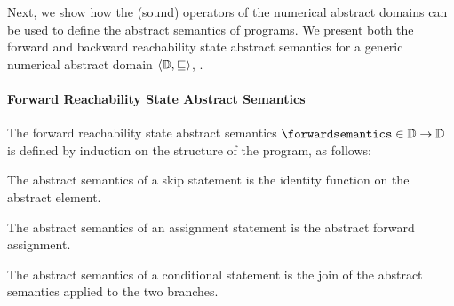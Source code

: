 Next, we show how the (sound) operators of the numerical abstract domains can be used to define the abstract semantics of programs. We present both the forward and backward reachability state abstract semantics for a generic numerical abstract domain $\langle \mathbb{D}, \sqsubseteq \rangle$, \cf{} .

\paragraph{Forward Reachability State Abstract Semantics}

The forward reachability state abstract semantics $\forwardsemantics\in\forwardtype$ is defined by induction on the structure of the program, as follows:

\begin{description}
  \item[\normalfont ($\pskipstmt$)] The abstract semantics of a skip statement is the identity function on the abstract element.
  \item[\normalfont ($\plassignstmt$)] The abstract semantics of an assignment statement is the abstract forward assignment.
  \item[\normalfont ($\pifstmt$)] The abstract semantics of a conditional statement is the join of the abstract semantics applied to the two branches.
  \marginnote{
    \begin{align*}

\end{align*}}
\end{description}
